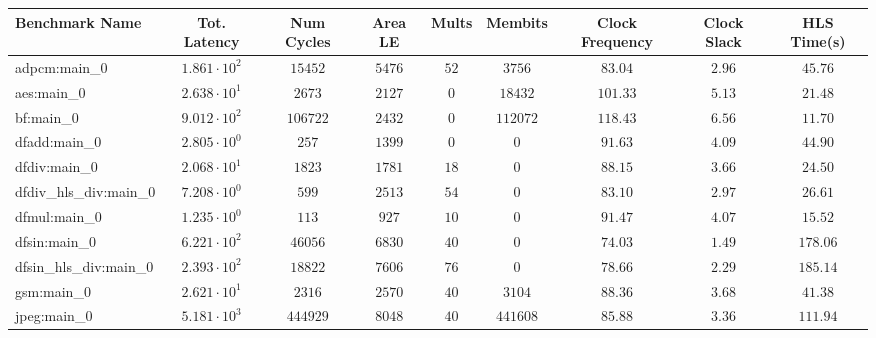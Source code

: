 \begin{tabular}{|l|c|c|c|c|c|c|c|c|}
\hline
Benchmark Name          & Tot. Latency           & Num Cycles & Area LE   & Mults   & Membits    & Clock Frequency & Clock Slack & HLS Time(s) \\
\hline
adpcm:main\_0           & $ 1.861 \cdot 10^{2} $ & $ 15452  $ & $ 5476  $ & $ 52  $ & $ 3756   $ & $ 83.04       $ & $ 2.96    $ & $ 45.76   $ \\
aes:main\_0             & $ 2.638 \cdot 10^{1} $ & $ 2673   $ & $ 2127  $ & $ 0   $ & $ 18432  $ & $ 101.33      $ & $ 5.13    $ & $ 21.48   $ \\
bf:main\_0              & $ 9.012 \cdot 10^{2} $ & $ 106722 $ & $ 2432  $ & $ 0   $ & $ 112072 $ & $ 118.43      $ & $ 6.56    $ & $ 11.70   $ \\
dfadd:main\_0           & $ 2.805 \cdot 10^{0} $ & $ 257    $ & $ 1399  $ & $ 0   $ & $ 0      $ & $ 91.63       $ & $ 4.09    $ & $ 44.90   $ \\
dfdiv:main\_0           & $ 2.068 \cdot 10^{1} $ & $ 1823   $ & $ 1781  $ & $ 18  $ & $ 0      $ & $ 88.15       $ & $ 3.66    $ & $ 24.50   $ \\
dfdiv\_hls\_div:main\_0 & $ 7.208 \cdot 10^{0} $ & $ 599    $ & $ 2513  $ & $ 54  $ & $ 0      $ & $ 83.10       $ & $ 2.97    $ & $ 26.61   $ \\
dfmul:main\_0           & $ 1.235 \cdot 10^{0} $ & $ 113    $ & $ 927   $ & $ 10  $ & $ 0      $ & $ 91.47       $ & $ 4.07    $ & $ 15.52   $ \\
dfsin:main\_0           & $ 6.221 \cdot 10^{2} $ & $ 46056  $ & $ 6830  $ & $ 40  $ & $ 0      $ & $ 74.03       $ & $ 1.49    $ & $ 178.06  $ \\
dfsin\_hls\_div:main\_0 & $ 2.393 \cdot 10^{2} $ & $ 18822  $ & $ 7606  $ & $ 76  $ & $ 0      $ & $ 78.66       $ & $ 2.29    $ & $ 185.14  $ \\
gsm:main\_0             & $ 2.621 \cdot 10^{1} $ & $ 2316   $ & $ 2570  $ & $ 40  $ & $ 3104   $ & $ 88.36       $ & $ 3.68    $ & $ 41.38   $ \\
jpeg:main\_0            & $ 5.181 \cdot 10^{3} $ & $ 444929 $ & $ 8048  $ & $ 40  $ & $ 441608 $ & $ 85.88       $ & $ 3.36    $ & $ 111.94  $ \\

\end{tabular}
